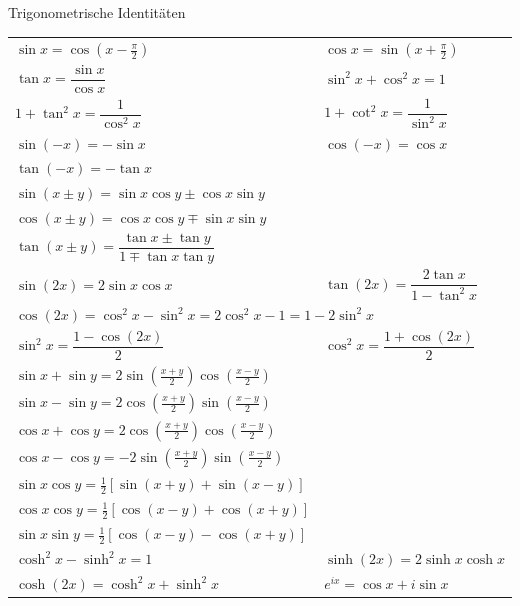 \begin{minipage}{\linewidth}
\Tab Trigonometrische Identitäten

\begin{tabular}{l l}
    $\sin x = \cos(x - \frac{\pi}{2})$ & $\cos x = \sin(x + \frac{\pi}{2})$ \\[1ex]
    $\tan x = \dfrac{\sin x}{\cos x}$ & $\sin^2 x + \cos^2 x = 1$ \\[1ex]
    $1 + \tan^2 x = \dfrac{1}{\cos^2 x}$ & $1 + \cot^2 x = \dfrac{1}{\sin^2 x}$ \\[1.5ex]
    \hline
    $\sin(-x) = -\sin x$ & $\cos(-x) = \cos x$ \\[1ex]
    $\tan(-x) = -\tan x$ & \\[0.5ex]
    \hline
    \multicolumn{2}{l}{$\sin(x \pm y) = \sin x \cos y \pm \cos x \sin y$} \\[1ex]
    \multicolumn{2}{l}{$\cos(x \pm y) = \cos x \cos y \mp \sin x \sin y$} \\[1ex]
    \multicolumn{2}{l}{$\tan(x \pm y) = \dfrac{\tan x \pm \tan y}{1 \mp \tan x \tan y}$} \\[0.5ex]
    \hline
    $\sin(2x) = 2\sin x \cos x$ & $\tan(2x) = \dfrac{2\tan x}{1 - \tan^2 x}$ \\[1ex]
    \multicolumn{2}{l}{$\cos(2x) = \cos^2 x - \sin^2 x = 2\cos^2 x - 1 = 1 - 2\sin^2 x$} \\[1ex]
    $\sin^2 x = \dfrac{1 - \cos(2x)}{2}$ & $\cos^2 x = \dfrac{1 + \cos(2x)}{2}$ \\[1ex]
    \hline
    \multicolumn{2}{l}{$\sin x + \sin y = 2 \sin\!\left(\frac{x+y}{2}\right)\cos\!\left(\frac{x-y}{2}\right)$} \\[1ex]
    \multicolumn{2}{l}{$\sin x - \sin y = 2 \cos\!\left(\frac{x+y}{2}\right)\sin\!\left(\frac{x-y}{2}\right)$} \\[1ex]
    \multicolumn{2}{l}{$\cos x + \cos y = 2 \cos\!\left(\frac{x+y}{2}\right)\cos\!\left(\frac{x-y}{2}\right)$} \\[1ex]
    \multicolumn{2}{l}{$\cos x - \cos y = -2 \sin\!\left(\frac{x+y}{2}\right)\sin\!\left(\frac{x-y}{2}\right)$} \\[1ex]
    \hline
    $\sin x \cos y = \frac{1}{2}[\sin(x+y) + \sin(x-y)]$ & \\[1ex]
    $\cos x \cos y = \frac{1}{2}[\cos(x-y) + \cos(x+y)]$ & \\[1ex]
    $\sin x \sin y = \frac{1}{2}[\cos(x-y) - \cos(x+y)]$ & \\[0.5ex]
    \hline
    $\cosh^2 x - \sinh^2 x = 1$ & $\sinh(2x) = 2\sinh x \cosh x$ \\[1ex]
    $\cosh(2x) = \cosh^2 x + \sinh^2 x$ & $e^{ix} = \cos x + i \sin x$ \\
\end{tabular}
\end{minipage}
